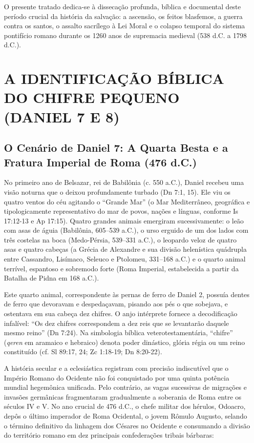 O presente tratado dedica-se à dissecação profunda, bíblica e documental deste período crucial da história da salvação: a ascensão, os feitos blasfemos, a guerra contra os santos, o assalto sacrílego à Lei Moral e o colapso temporal do sistema pontifício romano durante os 1260 anos de supremacia medieval (538 d.C. a 1798 d.C.).



\section{A IDENTIFICAÇÃO BÍBLICA DO CHIFRE PEQUENO (DANIEL 7 E 8)}



\subsection{O Cenário de Daniel 7: A Quarta Besta e a Fratura Imperial de Roma (476 d.C.)}


No primeiro ano de Belsazar, rei de Babilônia (c. 550 a.C.), Daniel recebeu uma visão noturna que o deixou profundamente turbado (Dn 7:1, 15). Ele viu os quatro ventos do céu agitando o ``Grande Mar'' (o Mar Mediterrâneo, geográfica e tipologicamente representativo do mar de povos, nações e línguas, conforme Is 17:12-13 e Ap 17:15). Quatro grandes animais emergiram sucessivamente: o leão com asas de águia (Babilônia, 605–539 a.C.), o urso erguido de um dos lados com três costelas na boca (Medo-Pérsia, 539–331 a.C.), o leopardo veloz de quatro asas e quatro cabeças (a Grécia de Alexandre e sua divisão helenística quádrupla entre Cassandro, Lisímaco, Seleuco e Ptolomeu, 331–168 a.C.) e o quarto animal terrível, espantoso e sobremodo forte (Roma Imperial, estabelecida a partir da Batalha de Pidna em 168 a.C.).

Este quarto animal, correspondente às pernas de ferro de Daniel 2, possuía dentes de ferro que devoravam e despedaçavam, pisando aos pés o que sobejava, e ostentava em sua cabeça dez chifres. O anjo intérprete fornece a decodificação infalível: ``Os dez chifres correspondem a dez reis que se levantarão daquele mesmo reino'' (Dn 7:24). Na simbologia bíblica veterotestamentária, ``chifre'' (\textit{qeren} em aramaico e hebraico) denota poder dinástico, glória régia ou um reino constituído (cf. Sl 89:17, 24; Zc 1:18-19; Dn 8:20-22).

A história secular e a eclesiástica registram com precisão indiscutível que o Império Romano do Ocidente não foi conquistado por uma quinta potência mundial hegemônica unificada. Pelo contrário, as vagas sucessivas de migrações e invasões germânicas fragmentaram gradualmente a soberania de Roma entre os séculos IV e V. No ano crucial de 476 d.C., o chefe militar dos hérulos, Odoacro, depôs o último imperador de Roma Ocidental, o jovem Rômulo Augusto, selando o término definitivo da linhagem dos Césares no Ocidente e consumando a divisão do território romano em dez principais confederações tribais bárbaras:

